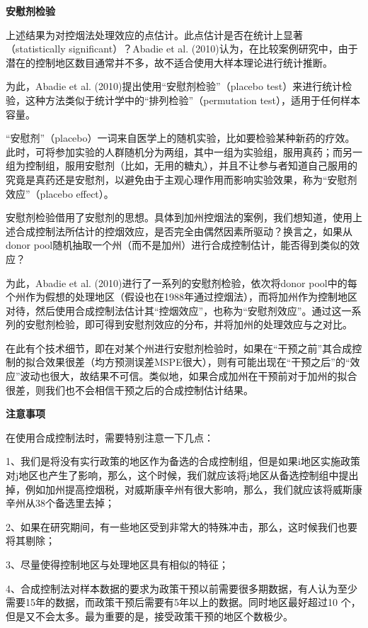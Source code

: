 \documentclass[cn,10pt,math=newtx,citestyle=gb7714-2015,bibstyle=gb7714-2015]{elegantbook}
\begin{document}
	\textbf{安慰剂检验}
	
	上述结果为对控烟法处理效应的点估计。此点估计是否在统计上显著（statistically significant）？Abadie et al. (2010)认为，在比较案例研究中，由于潜在的控制地区数目通常并不多，故不适合使用大样本理论进行统计推断。
	
	为此，Abadie et al. (2010)提出使用“安慰剂检验”（placebo test）来进行统计检验，这种方法类似于统计学中的“排列检验”（permutation test），适用于任何样本容量。
	
	“安慰剂”（placebo）一词来自医学上的随机实验，比如要检验某种新药的疗效。此时，可将参加实验的人群随机分为两组，其中一组为实验组，服用真药；而另一组为控制组，服用安慰剂（比如，无用的糖丸），并且不让参与者知道自己服用的究竟是真药还是安慰剂，以避免由于主观心理作用而影响实验效果，称为“安慰剂效应”（placebo effect）。
	
	安慰剂检验借用了安慰剂的思想。具体到加州控烟法的案例，我们想知道，使用上述合成控制法所估计的控烟效应，是否完全由偶然因素所驱动？换言之，如果从donor pool随机抽取一个州（而不是加州）进行合成控制估计，能否得到类似的效应？
	
	为此，Abadie et al. (2010)进行了一系列的安慰剂检验，依次将donor pool中的每个州作为假想的处理地区（假设也在1988年通过控烟法），而将加州作为控制地区对待，然后使用合成控制法估计其“控烟效应”，也称为“安慰剂效应”。通过这一系列的安慰剂检验，即可得到安慰剂效应的分布，并将加州的处理效应与之对比。
	
	在此有个技术细节，即在对某个州进行安慰剂检验时，如果在“干预之前”其合成控制的拟合效果很差（均方预测误差MSPE很大），则有可能出现在“干预之后”的“效应”波动也很大，故结果不可信。类似地，如果合成加州在干预前对于加州的拟合很差，则我们也不会相信干预之后的合成控制估计结果。
	
	\textbf{注意事项}
	
	在使用合成控制法时，需要特别注意一下几点：
	
	1、我们是将没有实行政策的地区作为备选的合成控制组，但是如果i地区实施政策对j地区也产生了影响，那么，这个时候，我们就应该将j地区从备选控制组中提出掉，例如加州提高控烟税，对威斯康辛州有很大影响，那么，我们就应该将威斯康辛州从38个备选里去掉；
	
	2、如果在研究期间，有一些地区受到非常大的特殊冲击，那么，这时候我们也要将其剔除；
	
	3、尽量使得控制地区与处理地区具有相似的特征；
	
	4、合成控制法对样本数据的要求为政策干预以前需要很多期数据，有人认为至少需要15年的数据，而政策干预后需要有5年以上的数据。同时地区最好超过10 个，但是又不会太多。最为重要的是，接受政策干预的地区个数极少。
	
\end{document}
